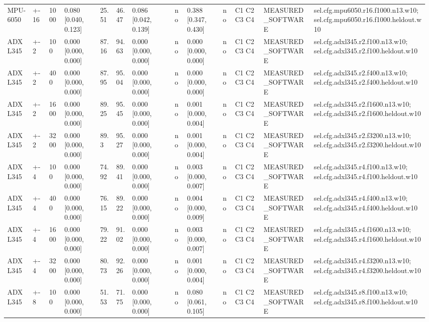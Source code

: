 \begin{table}[t]
\begin{tabular}{llllllllllllll}
MPU-6050 & +-16 & 1000 & 0.080 [0.040, 0.123] & 25.51 & 46.47 & 0.086 [0.042, 0.139] &  & no & 0.388 [0.347, 0.430] & no & C1 C2 C3 C4 & MEASURED\_SOFTWARE & sel.cfg.mpu6050.r16.f1000.n13.w10; sel.cfg.mpu6050.r16.f1000.heldout.w10 \\
ADXL345 & +-2 & 100 & 0.000 [0.000, 0.000] & 87.16 & 94.63 & 0.000 [0.000, 0.000] &  & no & 0.000 [0.000, 0.000] & no & C1 C2 C3 C4 & MEASURED\_SOFTWARE & sel.cfg.adxl345.r2.f100.n13.w10; sel.cfg.adxl345.r2.f100.heldout.w10 \\
ADXL345 & +-2 & 400 & 0.000 [0.000, 0.000] & 87.95 & 95.04 & 0.000 [0.000, 0.000] &  & no & 0.000 [0.000, 0.000] & no & C1 C2 C3 C4 & MEASURED\_SOFTWARE & sel.cfg.adxl345.r2.f400.n13.w10; sel.cfg.adxl345.r2.f400.heldout.w10 \\
ADXL345 & +-2 & 1600 & 0.000 [0.000, 0.000] & 89.25 & 95.45 & 0.000 [0.000, 0.000] &  & no & 0.001 [0.000, 0.004] & no & C1 C2 C3 C4 & MEASURED\_SOFTWARE & sel.cfg.adxl345.r2.f1600.n13.w10; sel.cfg.adxl345.r2.f1600.heldout.w10 \\
ADXL345 & +-2 & 3200 & 0.000 [0.000, 0.000] & 89.3 & 95.27 & 0.000 [0.000, 0.000] &  & no & 0.001 [0.000, 0.004] & no & C1 C2 C3 C4 & MEASURED\_SOFTWARE & sel.cfg.adxl345.r2.f3200.n13.w10; sel.cfg.adxl345.r2.f3200.heldout.w10 \\
ADXL345 & +-4 & 100 & 0.000 [0.000, 0.000] & 74.92 & 89.41 & 0.000 [0.000, 0.000] &  & no & 0.003 [0.000, 0.007] & no & C1 C2 C3 C4 & MEASURED\_SOFTWARE & sel.cfg.adxl345.r4.f100.n13.w10; sel.cfg.adxl345.r4.f100.heldout.w10 \\
ADXL345 & +-4 & 400 & 0.000 [0.000, 0.000] & 76.15 & 89.22 & 0.000 [0.000, 0.000] &  & no & 0.004 [0.000, 0.009] & no & C1 C2 C3 C4 & MEASURED\_SOFTWARE & sel.cfg.adxl345.r4.f400.n13.w10; sel.cfg.adxl345.r4.f400.heldout.w10 \\
ADXL345 & +-4 & 1600 & 0.000 [0.000, 0.000] & 79.22 & 91.02 & 0.000 [0.000, 0.000] &  & no & 0.003 [0.000, 0.007] & no & C1 C2 C3 C4 & MEASURED\_SOFTWARE & sel.cfg.adxl345.r4.f1600.n13.w10; sel.cfg.adxl345.r4.f1600.heldout.w10 \\
ADXL345 & +-4 & 3200 & 0.000 [0.000, 0.000] & 80.73 & 92.26 & 0.000 [0.000, 0.000] &  & no & 0.001 [0.000, 0.004] & no & C1 C2 C3 C4 & MEASURED\_SOFTWARE & sel.cfg.adxl345.r4.f3200.n13.w10; sel.cfg.adxl345.r4.f3200.heldout.w10 \\
ADXL345 & +-8 & 100 & 0.000 [0.000, 0.000] & 51.53 & 71.75 & 0.000 [0.000, 0.000] &  & no & 0.080 [0.061, 0.105] & no & C1 C2 C3 C4 & MEASURED\_SOFTWARE & sel.cfg.adxl345.r8.f100.n13.w10; sel.cfg.adxl345.r8.f100.heldout.w10 \\

\end{tabular}
\end{table}
